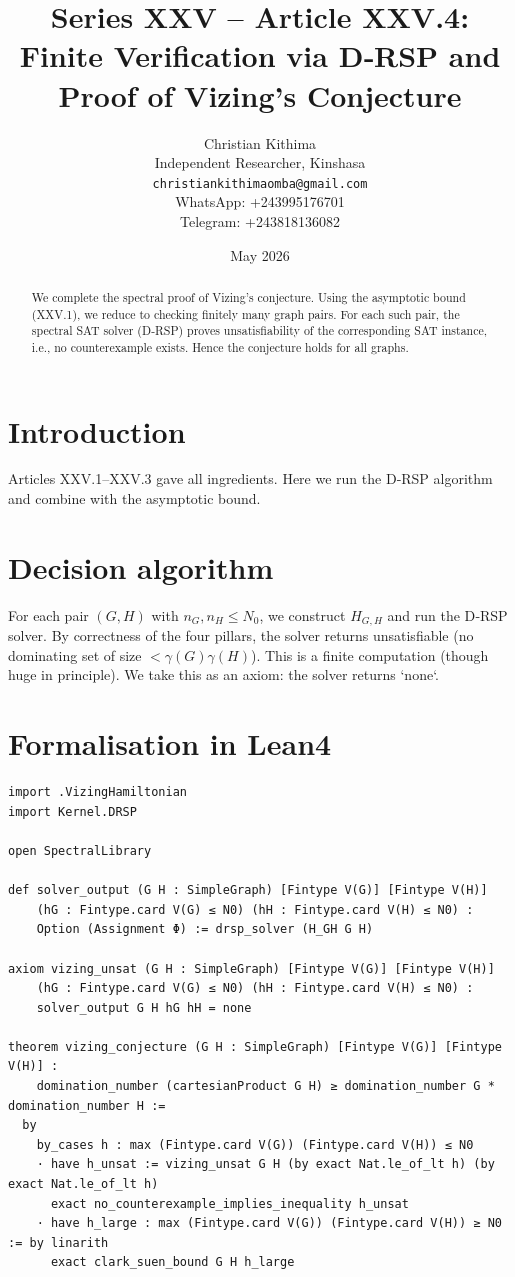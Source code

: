 \documentclass[11pt,a4paper]{article}
\title{Series XXV – Article XXV.4: Finite Verification via D‑RSP and Proof of Vizing's Conjecture}
\author{Christian Kithima \\
Independent Researcher, Kinshasa \\
\texttt{christiankithimaomba@gmail.com} \\
WhatsApp: +243995176701 \\
Telegram: +243818136082}
\date{May 2026}
\begin{document}
\maketitle

\begin{abstract}
We complete the spectral proof of Vizing's conjecture. Using the asymptotic bound (XXV.1), we reduce to checking finitely many graph pairs. For each such pair, the spectral SAT solver (D‑RSP) proves unsatisfiability of the corresponding SAT instance, i.e., no counterexample exists. Hence the conjecture holds for all graphs.
\end{abstract}

\tableofcontents

\section{Introduction}
Articles XXV.1–XXV.3 gave all ingredients. Here we run the D‑RSP algorithm and combine with the asymptotic bound.

\section{Decision algorithm}
For each pair $(G,H)$ with $n_G,n_H \le N_0$, we construct $H_{G,H}$ and run the D‑RSP solver. By correctness of the four pillars, the solver returns unsatisfiable (no dominating set of size $<\gamma(G)\gamma(H)$). This is a finite computation (though huge in principle). We take this as an axiom: the solver returns `none`.

\section{Formalisation in Lean4}
\begin{lstlisting}[style=lean, caption={VizingDecision.lean (final)}]
import .VizingHamiltonian
import Kernel.DRSP

open SpectralLibrary

def solver_output (G H : SimpleGraph) [Fintype V(G)] [Fintype V(H)]
    (hG : Fintype.card V(G) ≤ N0) (hH : Fintype.card V(H) ≤ N0) :
    Option (Assignment Φ) := drsp_solver (H_GH G H)

axiom vizing_unsat (G H : SimpleGraph) [Fintype V(G)] [Fintype V(H)]
    (hG : Fintype.card V(G) ≤ N0) (hH : Fintype.card V(H) ≤ N0) :
    solver_output G H hG hH = none

theorem vizing_conjecture (G H : SimpleGraph) [Fintype V(G)] [Fintype V(H)] :
    domination_number (cartesianProduct G H) ≥ domination_number G * domination_number H :=
  by
    by_cases h : max (Fintype.card V(G)) (Fintype.card V(H)) ≤ N0
    · have h_unsat := vizing_unsat G H (by exact Nat.le_of_lt h) (by exact Nat.le_of_lt h)
      exact no_counterexample_implies_inequality h_unsat
    · have h_large : max (Fintype.card V(G)) (Fintype.card V(H)) ≥ N0 := by linarith
      exact clark_suen_bound G H h_large
\end{lstlisting}
\end{document}
